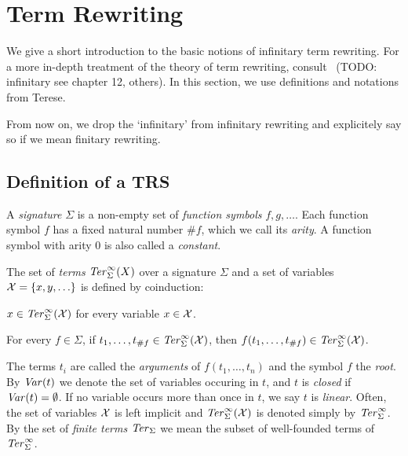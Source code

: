 

\section{Term Rewriting}\label{sec:rewriting}


We give a short introduction to the basic notions of infinitary term
rewriting. For a more in-depth treatment of the theory of term rewriting,
consult~\cite{terese-03} (TODO: infinitary see chapter 12, others). In this
section, we use definitions and notations from Terese.

From now on, we drop the `infinitary' from infinitary rewriting and
explicitely say so if we mean finitary rewriting.


\subsection{Definition of a TRS}\label{sub:trs}

\begin{definition}%
A \emph{signature} $\Sigma$ is a non-empty set of \emph{function symbols} $f,
g, \ldots$. Each function symbol $f$ has a fixed natural number $\#f$, which
we call its \emph{arity}. A function symbol with arity $0$ is also called a
\emph{constant}.
\end{definition}

\begin{definition}%
The set of \emph{terms} $\mathit{Ter}_\Sigma^\infty(X)$ over a signature $\Sigma$ and a
set of variables $\mathcal{X} = \{x, y, \ldots\}$ is defined by coinduction:
\begin{compactenum}
  \item
    $x \in \mathit{Ter}_\Sigma^\infty(\mathcal{X})$ for every variable $x \in \mathcal{X}$.
  \item
    For every $f \in \Sigma$, if $t_1, \ldots, t_{\#f} \in \mathit{Ter}_\Sigma^\infty(\mathcal{X})$,
    then $f(t_1, \ldots, t_{\#f}) \in \mathit{Ter}_\Sigma^\infty(\mathcal{X})$.
\end{compactenum}
\end{definition}

The terms $t_i$ are called the \emph{arguments} of $f(t_1, \ldots, t_n)$ and
the symbol $f$ the \emph{root}. By $\mathit{Var}(t)$ we denote the set of variables
occuring in $t$, and $t$ is \emph{closed} if $\mathit{Var}(t) = \emptyset$. If no
variable occurs more than once in $t$, we say $t$ is \emph{linear}.
Often, the set of variables $\mathcal{X}$ is left implicit and $\mathit{Ter}_\Sigma^\infty(\mathcal{X})$ is
denoted simply by $\mathit{Ter}_\Sigma^\infty$. By the set of \emph{finite terms} $\mathit{Ter}_\Sigma$ we
mean the subset of well-founded terms of $\mathit{Ter}_\Sigma^\infty$.

